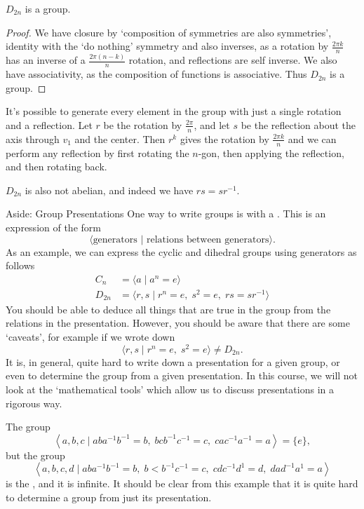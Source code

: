 \begin{proposition}
	$D_{2n}$ is a group.
\end{proposition}
\begin{proof}
	We have closure by `composition of symmetries are also symmetries', identity with the `do nothing' symmetry and also inverses, as a rotation by $\frac{2 \pi k}{n}$ has an inverse of a $\frac{2\pi(n - k)}{n}$ rotation, and reflections are self inverse. We also have associativity, as the composition of functions is associative. Thus $D_{2n}$ is a group. 
\end{proof}

It's possible to generate every element in the group with just a single rotation and a reflection. Let $r$ be the rotation by $\frac{2\pi}{n}$, and let $s$ be the reflection about the axis through $v_1$ and the center. Then $r^k$ gives the rotation by $\frac{2 \pi k}{n}$ and we can perform any reflection by first rotating the $n$-gon, then applying the reflection, and then rotating back. 

$D_{2n}$ is also not abelian, and indeed we have $rs = sr^{-1}$.

\begin{aside}{Aside: Group Presentations}
One way to write groups is with a . This is an expression of the form
$$
\langle \text{generators } \lvert \text{ relations between generators} \rangle.
$$
As an example, we can express the cyclic and dihedral groups using generators as follows
\begin{align*}
	C_n &= \langle a\mid  a^n = e \rangle \\
	D_{2n} &= \langle r, s \mid r^n = e,\; s^2 = e,\; rs = sr^{-1} \rangle
\end{align*}
You should be able to deduce all things that are true in the group from the relations in the presentation. However, you should be aware that there are some `caveats', for example if we wrote down
$$
\langle r, s \mid r^n = e, \; s^2 = e \rangle \neq D_{2n}.
$$
It is, in general, quite hard to write down a presentation for a given group, or even to determine the group from a given presentation. In this course, we will not look at the `mathematical tools' which allow us to discuss presentations in a rigorous 
way.

\begin{example}
	The group
	$$
	\left\langle a, b, c \mid a b a^{-1} b^{-1}=b, \; b c b^{-1} c^{-1}=c, \; cac^{-1} a^{-1}=a\right\rangle=\{e\},
	$$
	but the group
	$$
	\left\langle a, b, c, d \mid a b a^{-1} b^{-1}=b, \; b<b^{-1} c^{-1}=c,\; c d c^{-1} d^{1}=d, \; d a d^{-1} a^{1}=a\right\rangle
	$$
	is the , and it is infinite. It should be clear from this example that it is quite hard to determine a group from just its presentation.
\end{example}

\end{aside}

